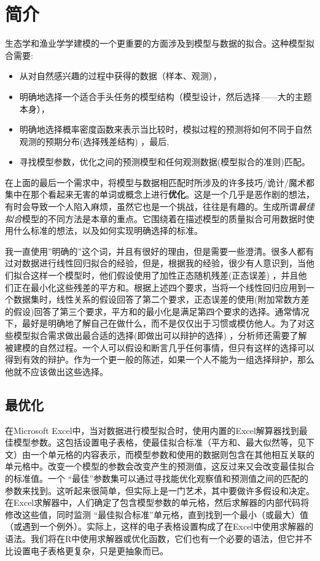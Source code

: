 \documentclass[
  lang=cn,
  11pt,
  scheme=chinese,
  chinesefont=nofont,
  citestyle=gb7714-2015,
  bibstyle=gb7714-2015]{elegantbook}
\begin{document}
\section{简介}\label{ux7b80ux4ecb-3}

生态学和渔业学学建模的一个更重要的方面涉及到模型与数据的拟合。这种模型拟合需要:

\begin{itemize}
\item
  从对自然感兴趣的过程中获得的数据（样本、观测），
\item
  明确地选择一个适合手头任务的模型结构（模型设计，然后选择------大的主题本身），
\item
  明确地选择概率密度函数来表示当比较时，模拟过程的预测将如何不同于自然观测的预期分布(选择残差结构) ，最后,
\item
  寻找模型参数，优化之间的预测模型和任何观测数据(模型拟合的准则)匹配。
\end{itemize}

在上面的最后一个需求中，将模型与数据相匹配时所涉及的许多技巧/诡计/魔术都集中在那个看起来无害的单词或概念上进行\textbf{优化}。这是一个几乎是恶作剧的想法，有时会导致一个人陷入麻烦，虽然它也是一个挑战，往往是有趣的。生成所谓\emph{最佳拟合}模型的不同方法是本章的重点。它围绕着在描述模型的质量拟合可用数据时使用什么标准的想法，以及如何实现明确选择的标准。

我一直使用''明确的''这个词，并且有很好的理由，但是需要一些澄清。很多人都有过对数据进行线性回归拟合的经验，但是，根据我的经验，很少有人意识到，当他们拟合这样一个模型时，他们假设使用了加性正态随机残差(正态误差) ，并且他们正在最小化这些残差的平方和。根据上述四个要求，当将一个线性回归应用到一个数据集时，线性关系的假设回答了第二个要求，正态误差的使用(附加常数方差的假设)回答了第三个要求，平方和的最小化是满足第四个要求的选择。通常情况下，最好是明确地了解自己在做什么，而不是仅仅出于习惯或模仿他人。为了对这些模型拟合需求做出最合适的选择(即做出可以辩护的选择) ，分析师还需要了解被建模的自然过程。一个人可以假设和断言几乎任何事情，但只有这样的选择可以得到有效的辩护。作为一个更一般的陈述，如果一个人不能为一组选择辩护，那么他就不应该做出这些选择。

\subsection{最优化}\label{ux6700ux4f18ux5316}

在Microsoft Excel中，当对数据进行模型拟合时，使用内置的Excel解算器找到最佳模型参数。这包括设置电子表格，使最佳拟合标准（平方和、最大似然等，见下文）由一个单元格的内容表示，而模型参数和使用的数据则包含在其他相互关联的单元格中。改变一个模型的参数会改变产生的预测值，这反过来又会改变最佳拟合的标准值。一个 ``最佳''参数集可以通过寻找能优化观察值和预测值之间的匹配的参数来找到。这听起来很简单，但实际上是一门艺术，其中要做许多假设和决定。在Excel求解器中，人们确定了包含模型参数的单元格，然后求解器的内部代码将修改这些值，同时监测 ``最佳拟合标准''单元格，直到找到一个最小（或最大）值（或遇到一个例外）。实际上，这样的电子表格设置构成了在Excel中使用求解器的语法。我们将在R中使用求解器或优化函数，它们也有一个必要的语法，但它并不比设置电子表格更复杂，只是更抽象而已。
\end{document}
